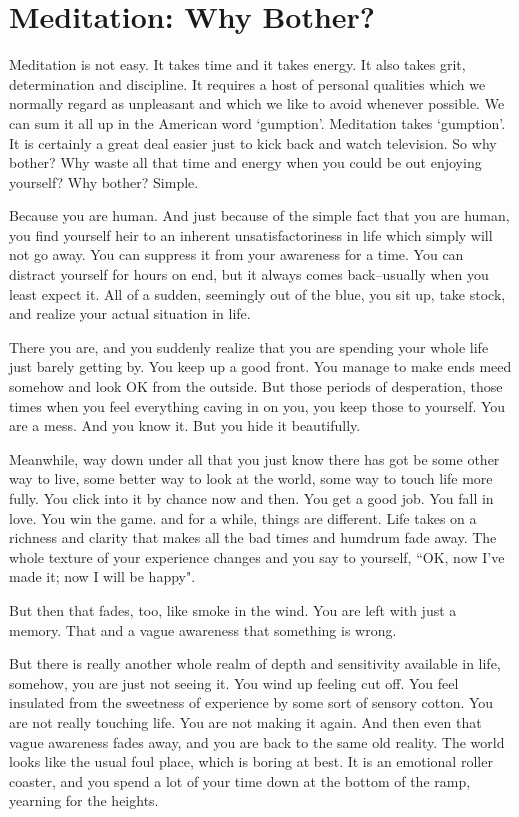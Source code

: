 \chapter{Meditation: Why Bother?}

Meditation is not easy. It takes time and it takes energy. It also takes grit,
determination and discipline. It requires a host of personal qualities which we
normally regard as unpleasant and which we like to avoid whenever possible. We
can sum it all up in the American word `gumption'. Meditation takes `gumption'.
It is certainly a great deal easier just to kick back and watch television. So
why bother? Why waste all that time and energy when you could be out enjoying
yourself? Why bother? Simple.

Because you are human. And just because of the simple fact that you are human,
you find yourself heir to an inherent unsatisfactoriness in life which simply
will not go away. You can suppress it from your awareness for a time. You can
distract yourself for hours on end, but it always comes back--usually when you
least expect it. All of a sudden, seemingly out of the blue, you sit up, take
stock, and realize your actual situation in life.

There you are, and you suddenly realize that you are spending your whole life
just barely getting by. You keep up a good front.  You manage to make ends meed
somehow and look OK from the outside. But those periods of desperation, those
times when you feel everything caving in on you, you keep those to yourself. You
are a mess. And you know it. But you hide it beautifully.

Meanwhile, way down under all that you just know there has got be some other way
to live, some better way to look at the world, some way to touch life more
fully. You click into it by chance now and then. You get a good job. You fall in
love. You win the game. and for a while, things are different. Life takes on a
richness and clarity that makes all the bad times and humdrum fade away. The
whole texture of your experience changes and you say to yourself, ``OK, now I've
made it; now I will be happy".

But then that fades, too, like smoke in the wind. You are left with just a
memory. That and a vague awareness that something is wrong.

But there is really another whole realm of depth and sensitivity available in
life, somehow, you are just not seeing it. You wind up feeling cut off. You feel
insulated from the sweetness of experience by some sort of sensory cotton. You
are not really touching life. You are not making it again. And then even that
vague awareness fades away, and you are back to the same old reality. The world
looks like the usual foul place, which is boring at best. It is an emotional
roller coaster, and you spend a lot of your time down at the bottom of the ramp,
yearning for the heights.

